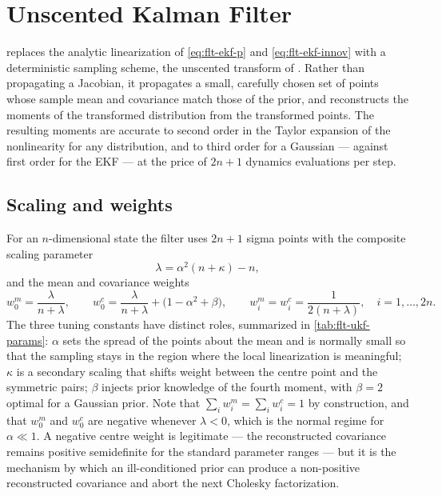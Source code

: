 \section{Unscented Kalman Filter}
\label{sec:flt-ukf}

 replaces the analytic linearization of \cref{eq:flt-ekf-p} and
\cref{eq:flt-ekf-innov} with a deterministic sampling scheme, the unscented
transform of \citet{julier2004ukf}. Rather than propagating a Jacobian, it
propagates a small, carefully chosen set of points whose sample mean and
covariance match those of the prior, and reconstructs the moments of the
transformed distribution from the transformed points. The resulting moments are
accurate to second order in the Taylor expansion of the nonlinearity for any
distribution, and to third order for a Gaussian --- against first order for the
EKF --- at the price of $2n+1$ dynamics evaluations per step.

\subsection{Scaling and weights}

For an $n$-dimensional state the filter uses $2n+1$ sigma points with the
composite scaling parameter
\begin{equation}
  \label{eq:flt-ukf-lambda}
  \lambda = \alpha^2 (n + \kappa) - n ,
\end{equation}
and the mean and covariance weights
\begin{equation}
  \label{eq:flt-ukf-weights}
  w^m_0 = \frac{\lambda}{n+\lambda},
  \qquad
  w^c_0 = \frac{\lambda}{n+\lambda} + \bigl(1 - \alpha^2 + \beta\bigr),
  \qquad
  w^m_i = w^c_i = \frac{1}{2(n+\lambda)},
  \quad i = 1,\dots,2n .
\end{equation}
The three tuning constants have distinct roles, summarized in
\cref{tab:flt-ukf-params}: $\alpha$ sets the spread of the points about the
mean and is normally small so that the sampling stays in the region where the
local linearization is meaningful; $\kappa$ is a secondary scaling that shifts
weight between the centre point and the symmetric pairs; $\beta$ injects prior
knowledge of the fourth moment, with $\beta = 2$ optimal for a Gaussian prior.
Note that $\sum_i w^m_i = \sum_i w^c_i = 1$ by construction, and that $w^m_0$
and $w^c_0$ are negative whenever $\lambda < 0$, which is the normal regime for
$\alpha \ll 1$. A negative centre weight is legitimate --- the reconstructed
covariance remains positive semidefinite for the standard parameter ranges ---
but it is the mechanism by which an ill-conditioned prior can produce a
non-positive reconstructed covariance and abort the next Cholesky factorization.

